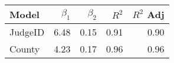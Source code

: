 \begin{tabular}{lrrrr}
\toprule
  Model &  $\beta_1$ &  $\beta_2$ &   $R^2$ &  $R^2$ Adj \\
\midrule
JudgeID &   6.48 &  0.15 & 0.91 &    0.90 \\
 County &   4.23 &  0.17 & 0.96 &    0.96 \\
\bottomrule
\end{tabular}
